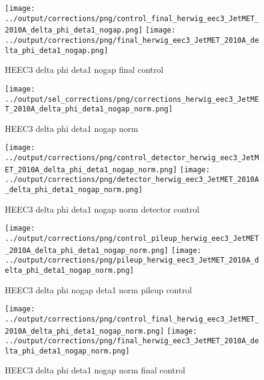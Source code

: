 \documentclass[11pt]{book}
\begin{document}
\begin{figure}[ht]
\centering
\texttt{[image: ../output/corrections/png/control\_final\_herwig\_eec3\_JetMET\_2010A\_delta\_phi\_deta1\_nogap.png]}
\texttt{[image: ../output/corrections/png/final\_herwig\_eec3\_JetMET\_2010A\_delta\_phi\_deta1\_nogap.png]}
\caption{HEEC3 delta phi deta1 nogap final control}
\label{fig:HEEC3_JetMET_2010A_delta_phi_deta1_nogap_final_control}
\end{figure}

\begin{figure}[ht]
\centering
\texttt{[image: ../output/sel\_corrections/png/corrections\_herwig\_eec3\_JetMET\_2010A\_delta\_phi\_deta1\_nogap\_norm.png]}
\caption{HEEC3 delta phi deta1 nogap norm}
\label{fig:HEEC3_JetMET_2010A_delta_phi_deta1_nogap_norm}
\end{figure}

\begin{figure}[ht]
\centering
\texttt{[image: ../output/corrections/png/control\_detector\_herwig\_eec3\_JetMET\_2010A\_delta\_phi\_deta1\_nogap\_norm.png]}
\texttt{[image: ../output/corrections/png/detector\_herwig\_eec3\_JetMET\_2010A\_delta\_phi\_deta1\_nogap\_norm.png]}
\caption{HEEC3 delta phi deta1 nogap norm detector control}
\label{fig:HEEC3_JetMET_2010A_delta_phi_deta1_nogap_norm_detector_control}
\end{figure}

\begin{figure}[ht]
\centering
\texttt{[image: ../output/corrections/png/control\_pileup\_herwig\_eec3\_JetMET\_2010A\_delta\_phi\_deta1\_nogap\_norm.png]}
\texttt{[image: ../output/corrections/png/pileup\_herwig\_eec3\_JetMET\_2010A\_delta\_phi\_deta1\_nogap\_norm.png]}
\caption{HEEC3 delta phi nogap deta1 norm pileup control}
\label{fig:HEEC3_JetMET_2010A_delta_phi_deta1_nogap_norm_pileup_control}
\end{figure}


\begin{figure}[ht]
\centering
\texttt{[image: ../output/corrections/png/control\_final\_herwig\_eec3\_JetMET\_2010A\_delta\_phi\_deta1\_nogap\_norm.png]}
\texttt{[image: ../output/corrections/png/final\_herwig\_eec3\_JetMET\_2010A\_delta\_phi\_deta1\_nogap\_norm.png]}
\caption{HEEC3 delta phi deta1 nogap norm final control}
\label{fig:HEEC3_JetMET_2010A_delta_phi_deta1_nogap_norm_final_control}
\end{figure}
\end{document}
